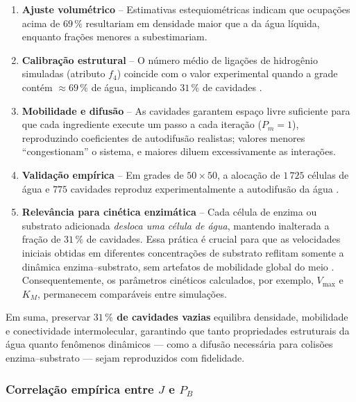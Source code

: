 \documentclass[12pt,oneside]{report}
\begin{document}
\begin{enumerate}[label=\alph*]
    \item \textbf{Ajuste volumétrico} – Estimativas estequiométricas indicam que
          ocupações acima de $69\,\%$ resultariam em densidade maior que a da
          água líquida, enquanto frações menores a subestimariam.

    \item \textbf{Calibração estrutural} – O número médio de ligações de
          hidrogênio simuladas (atributo $f_4$) coincide com o valor experimental
          quando a grade contém $\approx69\,\%$ de água, implicando
          $31\,\%$ de cavidades \cite{kier2005}.

    \item \textbf{Mobilidade e difusão} – As cavidades garantem espaço livre
          suficiente para que cada ingrediente execute um passo a cada iteração
          ($P_m=1$), reproduzindo coeficientes de autodifusão realistas; valores
          menores ``congestionam'' o sistema, e maiores diluem excessivamente as
          interações.

    \item \textbf{Validação empírica} – Em grades de $50\times50$, a alocação de
          $1\,725$ células de água e $775$ cavidades reproduz experimentalmente a autodifusão da água \cite{kier2005}.

    \item \textbf{Relevância para cinética enzimática} – Cada célula de
          enzima ou substrato adicionada \emph{desloca uma célula de água},
          mantendo inalterada a fração de $31\,\%$ de cavidades.  Essa prática é
          crucial para que as velocidades iniciais obtidas em diferentes
          concentrações de substrato reflitam somente a dinâmica
          enzima--substrato, sem artefatos de mobilidade global do meio
          \cite{kier2005}.  Consequentemente, os parâmetros cinéticos
          calculados, por exemplo, $V_{\max}$ e $K_M$,
          permanecem comparáveis entre simulações.
\end{enumerate}

Em suma, preservar \textbf{$31\,\%$ de cavidades vazias} equilibra densidade,
mobilidade e conectividade intermolecular, garantindo que tanto propriedades
estruturais da água quanto fenômenos dinâmicos — como a difusão necessária
para colisões enzima--substrato — sejam reproduzidos com fidelidade.

\subsubsection{Correlação empírica entre $J$ e $P_B$}
\label{subsubsec:J-PB}
\end{document}
